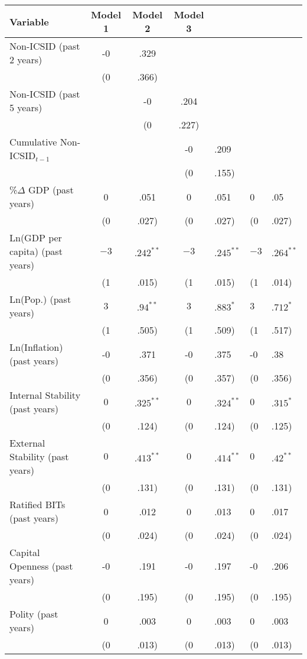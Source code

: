 \begin{table}[ht]
\centering
\begingroup\footnotesize
\begin{tabular}{lccc}
 Variable & Model 1 & Model 2 & Model 3 \\ 
  \hline
\hline
Non-ICSID (past 2 years) & -0&.329 &  &  \\ 
   & (0&.366) &  &  \\ 
  Non-ICSID (past 5 years) &  & -0&.204 &  \\ 
   &  & (0&.227) &  \\ 
  Cumulative Non-ICSID$_{t-1}$ &  &  & -0&.209 \\ 
   &  &  & (0&.155) \\ 
  \%$\Delta$ GDP (past  years) & 0&.051 & 0&.051 & 0&.05 \\ 
   & (0&.027) & (0&.027) & (0&.027) \\ 
  Ln(GDP per capita) (past  years) & $-3$&$.242^{\ast\ast}$ & $-3$&$.245^{\ast\ast}$ & $-3$&$.264^{\ast\ast}$ \\ 
   & (1&.015) & (1&.015) & (1&.014) \\ 
  Ln(Pop.) (past  years) & $3$&$.94^{\ast\ast}$ & $3$&$.883^{\ast}$ & $3$&$.712^{\ast}$ \\ 
   & (1&.505) & (1&.509) & (1&.517) \\ 
  Ln(Inflation) (past  years) & -0&.371 & -0&.375 & -0&.38 \\ 
   & (0&.356) & (0&.357) & (0&.356) \\ 
  Internal Stability (past  years) & $0$&$.325^{\ast\ast}$ & $0$&$.324^{\ast\ast}$ & $0$&$.315^{\ast}$ \\ 
   & (0&.124) & (0&.124) & (0&.125) \\ 
  External Stability (past  years) & $0$&$.413^{\ast\ast}$ & $0$&$.414^{\ast\ast}$ & $0$&$.42^{\ast\ast}$ \\ 
   & (0&.131) & (0&.131) & (0&.131) \\ 
  Ratified BITs (past  years) & 0&.012 & 0&.013 & 0&.017 \\ 
   & (0&.024) & (0&.024) & (0&.024) \\ 
  Capital Openness (past  years) & -0&.191 & -0&.197 & -0&.206 \\ 
   & (0&.195) & (0&.195) & (0&.195) \\ 
  Polity (past  years) & 0&.003 & 0&.003 & 0&.003 \\ 
   & (0&.013) & (0&.013) & (0&.013) \\ 

\end{tabular}
\end{table}
